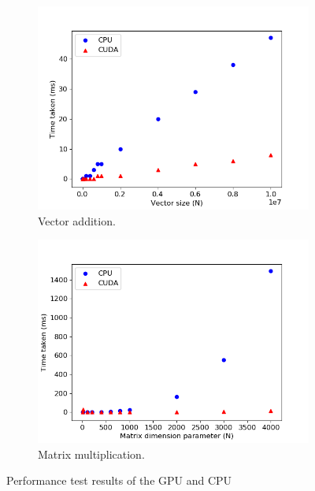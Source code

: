 \documentclass[12pt, twocolumn]{report}
\begin{document}
\begin{figure}[htbp]
    \centering
    \begin{subfigure}{0.8\textwidth}
        \centering
        \includegraphics[width=1\textwidth]{Figures/Test GPU and CPU vector addition.png}
        \caption{Vector addition.}
        \label{Test GPU and CPU vector addition}
    \end{subfigure}
    \begin{subfigure}{0.8\textwidth}
        \centering
        \includegraphics[width=1\textwidth]{Figures/Test GPU and CPU matrix multiplication.png}
        \caption{Matrix multiplication.}
        \label{Test GPU and CPU matrix multiplication}
    \end{subfigure}
    \caption{Performance test results of the GPU and CPU}
    \label{Test GPU and CPU}
\end{figure}
\end{document}
